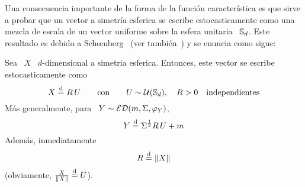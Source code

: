 Una consecuencia importante de la  forma de la funci\'on caracter\'istica es que
sirve a probar  que un vector a simetr\'ia  esferica se escribe estocasticamente
como  una mezcla de  escala de  un vector  uniforme sobre  la esfera  unitaria \
$\mathbb{S}_d$. Este resultado es  debido a Sch{\oe}nberg~\cite{Sch38, FanKot90} (ver
tambi\'en~\cite{KeiSte74, Tei60}) y se enuncia como sigue:
%
\begin{teorema}\label{Teo:MP:MezclaUniforme}
  Sea  \ $X$ \  $d$-dimensional a  simetria esferica.  Entonces, este  vector se
  escribe estocasticamente como
  \[
  X \stackrel{\mathrm{d}}{=} R \, U \qquad \mbox{con} \qquad U \sim \mathcal{U}(\mathbb{S}_d), \quad R > 0 \quad
  \mbox{independientes}
  \]
  M\'as generalmente, para \ $Y \sim \mathcal{ED}(m,\Sigma,\varphi_Y)$,
  \[
  Y \stackrel{\mathrm{d}}{=} \Sigma^{\frac12} R \, U + m
  \]
  Adem\'as, inmediatamente
  \[
  R \stackrel{\mathrm{d}}{=} \| X \|
  \]
  (obviamente, $\frac{X}{\| X \|} \stackrel{\mathrm{d}}{=} U$).
\end{teorema}
%
